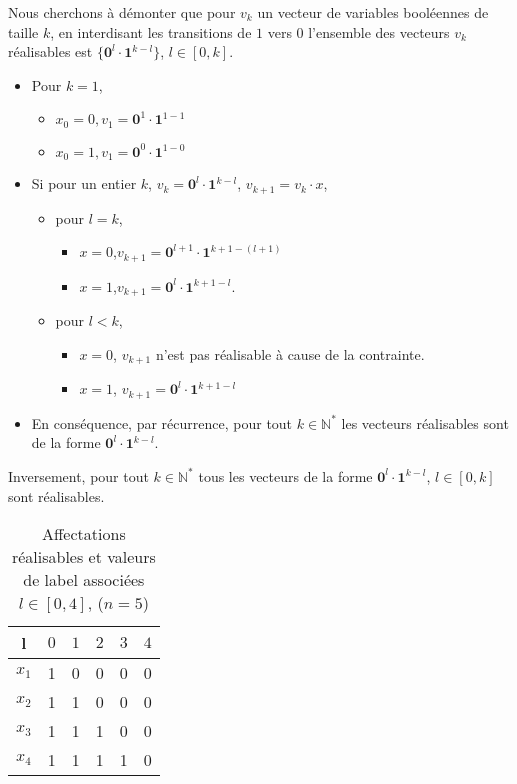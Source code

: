 \documentclass[../main/These_Mathias_Paget.tex]{subfiles}
\begin{document}
Nous cherchons à démonter que pour $v_k$ un vecteur de variables booléennes de taille $k$, en interdisant les transitions de $1$ vers $0$ l'ensemble des vecteurs $v_k$ réalisables est $\{\boldsymbol{0}^{l}\cdot\boldsymbol{1}^{k{-}l}\}$, $l \in [0,k]$.
\begin{itemize}
\item Pour $k=1$,
\begin{itemize}
\item $x_0=0, v_1 = \boldsymbol{0}^1\cdot\boldsymbol{1}^{1{-}1}$
\item $x_0=1,v_1 = \boldsymbol{0}^0\cdot\boldsymbol{1}^{1{-}0}$
\end{itemize}
\item Si pour un entier $k$, $v_k=\boldsymbol{0}^l\cdot\boldsymbol{1}^{k{-}l}$, $v_{k{+}1} = v_k \cdot x$,
\begin{itemize}
\item pour $l=k$,
\begin{itemize}
\item $x=0$,$v_{k{+}1}=\boldsymbol{0}^{l{+}1}\cdot\boldsymbol{1}^{k{+}1-(l{+}1)}$
\item $x=1$,$v_{k{+}1}=\boldsymbol{0}^{l}\cdot\boldsymbol{1}^{k{+}1{-}l}$.
\end{itemize}
\item pour $l<k$,
\begin{itemize}
\item $x=0$, $v_{k{+}1}$ n'est pas réalisable à cause de la contrainte.
\item $x=1$, $v_{k{+}1}=\boldsymbol{0}^{l}\cdot\boldsymbol{1}^{k{+}1{-}l}$
\end{itemize}
\end{itemize}
\item En conséquence, par récurrence, pour tout $k \in \mathbb{N}^*$ les vecteurs réalisables sont de la forme $\boldsymbol{0}^{l}\cdot\boldsymbol{1}^{k{-}l}$.
\end{itemize}
Inversement, pour tout $k \in \mathbb{N}^*$ tous les vecteurs de la forme $\boldsymbol{0}^{l}\cdot\boldsymbol{1}^{k{-}l}$, $l \in [0,k]$ sont réalisables.

\begin{table}
\centering
\begin{tabular}{c|ccccc}
	l & $0$ & $1$ & $2$ & $3$ & $4$ \\
	\hline
	$x_1$ & 1 & 0 & 0 & 0 & 0 \\
	$x_2$ & 1 & 1 & 0 & 0 & 0 \\
	$x_3$ & 1 & 1 & 1 & 0 & 0 \\
	$x_4$ & 1 & 1 & 1 & 1 & 0 \\
\end{tabular}
	\caption{Affectations réalisables et valeurs de label associées $l \in [0,4]$, ($n=5$)}
	\label{tab:aff_ish}
\end{table} 
\end{document}
